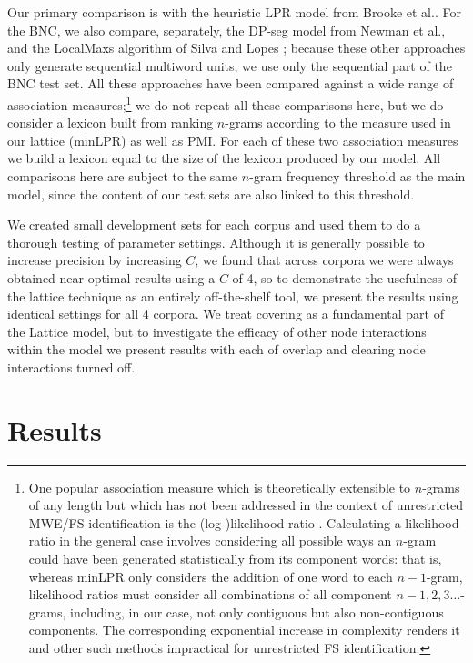 \documentclass[11pt,letterpaper]{article}
\makeatletter
\def \al {al.\@ }
\makeatother
\begin{document}
Our primary comparison is with the heuristic LPR model from Brooke et \al {}. For the BNC, we also compare, separately, the DP-seg model from Newman et \al {}, and the LocalMaxs algorithm of Silva and Lopes ; because these other approaches only generate sequential multiword units, we use only the sequential part of the BNC test set. All these approaches have been compared against a wide range of association measures;\footnote{One popular association measure which is theoretically extensible to $n$-grams of any length but which has not been addressed in the context of unrestricted MWE/FS identification is the (log-)likelihood ratio \cite{Dunning93}. Calculating a likelihood ratio in the general case involves considering all possible ways an $n$-gram could have been generated statistically from its component words: that is, whereas minLPR only considers the addition of one word to each $n-1$-gram, likelihood ratios must consider all combinations of all component $n-1,2,3\ldots$-grams, including, in our case, not only contiguous but also non-contiguous components. The corresponding exponential increase in complexity renders it and other such methods impractical for unrestricted FS identification.} we do not repeat all these comparisons here, but we do consider a lexicon built from ranking $n$-grams according to the measure used in our lattice (minLPR) as well as PMI. For each of these two association measures we build a lexicon equal to the size of the lexicon produced by our model. All comparisons here are subject to the same $n$-gram frequency threshold as the main model, since the content of our test sets are also linked to this threshold.

We created small development sets for each corpus and used them to do a thorough testing of parameter settings. Although it is generally possible to increase precision by increasing $C$, we found that across corpora we were always obtained near-optimal results using a $C$ of 4, so to demonstrate the usefulness of the lattice technique as an entirely off-the-shelf tool, we present the results using identical settings for all 4 corpora. We treat covering as a fundamental part of the Lattice model, but to investigate the efficacy of other node interactions within the model we present results with each of overlap and clearing node interactions turned off.
		

\section{Results}
\end{document}

